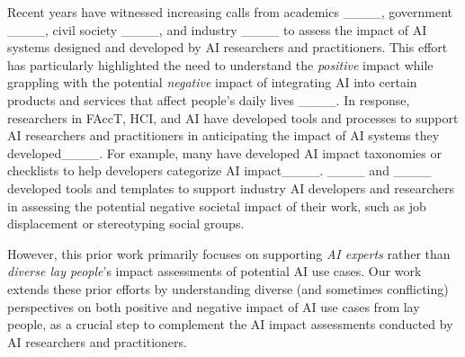 Recent years have witnessed increasing calls from academics ____, government ____, civil society ____, and industry ____ to assess the impact of AI systems designed and developed by AI researchers and practitioners. This effort has particularly highlighted the need to understand the \textit{positive} impact while grappling with the potential \textit{negative} impact of integrating AI into certain products and services that affect people's daily lives ____. 
In response, researchers in FAccT, HCI, and AI have developed tools and processes to support AI researchers and practitioners in anticipating the impact of AI systems they developed____. For example, many have developed AI impact taxonomies or checklists to help developers categorize AI impact____. ____ and ____ developed tools and templates to support industry AI developers and researchers in assessing the potential negative societal impact of their work, such as job displacement or stereotyping social groups. 

However, this prior work primarily focuses on supporting \textit{AI experts} rather than \textit{diverse lay people}'s impact assessments of potential AI use cases. Our work extends these prior efforts by understanding diverse (and sometimes conflicting) perspectives on both positive and negative impact of AI use cases from lay people, as a crucial step to complement the AI impact assessments conducted by AI researchers and practitioners. 


